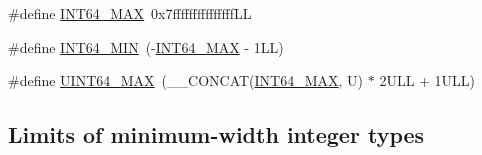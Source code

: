\begin{DoxyCompactItemize}
\item 
\#define \hyperlink{group__avr__stdint_gad0d744f05898e32d01f73f8af3cd2071}{I\+N\+T64\+\_\+\+M\+AX}~0x7fffffffffffffff\+LL
\item 
\#define \hyperlink{group__avr__stdint_gab21f12f372f67b8ff0aa3432336ede67}{I\+N\+T64\+\_\+\+M\+IN}~(-\/\hyperlink{group__avr__stdint_gad0d744f05898e32d01f73f8af3cd2071}{I\+N\+T64\+\_\+\+M\+AX} -\/ 1\+L\+L)
\item 
\#define \hyperlink{group__avr__stdint_ga30654b4b67d97c42ca3f9b6052dda916}{U\+I\+N\+T64\+\_\+\+M\+AX}~(\+\_\+\+\_\+\+C\+O\+N\+C\+AT(\hyperlink{group__avr__stdint_gad0d744f05898e32d01f73f8af3cd2071}{I\+N\+T64\+\_\+\+M\+AX}, U) $\ast$ 2\+U\+L\+L + 1\+U\+L\+L)
\end{DoxyCompactItemize}
\subsection*{Limits of minimum-\/width integer types}
